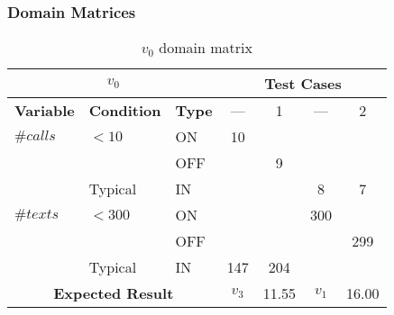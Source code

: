 \subsubsection{Domain Matrices}
\label{sec:methods.computeBill.matrices}
%
  {\protect\numberline{}}
\begin{table}[!htbp]
  \centering
  \begin{tabular}{|*{3}{l|}*{4}{c|}}
    \hline
    \multicolumn{3}{|c|}{$v_0$}
    & \multicolumn{4}{|c|}{\textbf{Test Cases}} \\ \hline
    \textbf{Variable} & \textbf{Condition} & \textbf{Type}
                              &  ---  &   1   &  ---  &   2   \\ \hline
    $\#calls$ & $< 10$  & ON  &  10   &       &       &       \\ \cline{3-7}
              &         & OFF &       &   9   &       &       \\ \cline{2-7}
              & Typical & IN  &       &       &   8   &   7   \\ \hline
    $\#texts$ & $< 300$ & ON  &       &       &  300  &       \\ \cline{3-7}
              &         & OFF &       &       &       &  299  \\ \cline{2-7}
              & Typical & IN  &  147  &  204  &       &       \\ \hline
    \multicolumn{3}{|c|}{\textbf{Expected Result}}
                              & $v_3$ & 11.55 & $v_1$ & 16.00 \\ \hline
  \end{tabular}
  \caption{$v_0$ domain matrix}
  \label{tab:methods.computeBill.matrices.v0}
\end{table}
\clearpage


